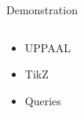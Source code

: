 \begin{frame}{Demonstration}
    \begin{columns}
        \begin{column}{0.4\textwidth}
            \begin{itemize}
                \item UPPAAL
                \item TikZ
                \item Queries
            \end{itemize}
        \end{column}
        \begin{column}{0.6\textwidth}

        \end{column}
    \end{columns}
\end{frame}

